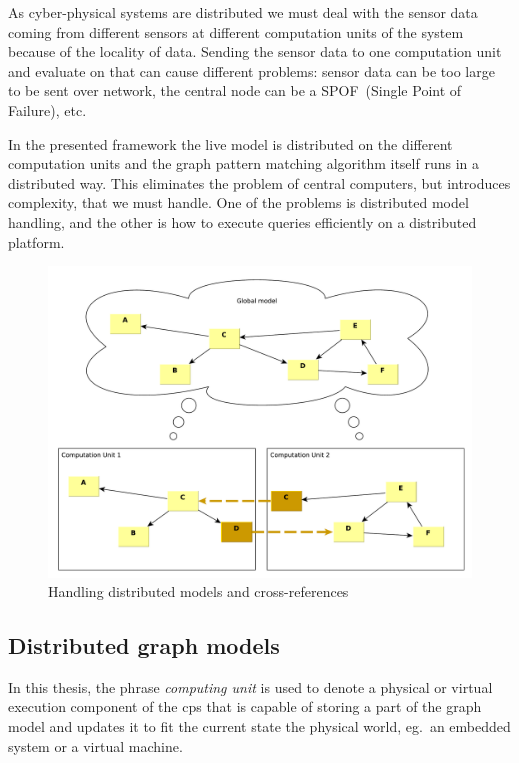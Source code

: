 As cyber-physical systems are distributed we must deal with the sensor data coming from different sensors at different computation units of the system because of the locality of data. 
Sending the sensor data to one computation unit and evaluate on that can cause different problems: 
sensor data can be too large to be sent over network, the central node can be a SPOF~(Single Point of Failure), etc. 

In the presented framework the live model is distributed on the different computation units and the graph pattern matching algorithm itself runs in a distributed way. 
This eliminates the problem of central computers, but introduces complexity, that we must handle.
One of the problems is distributed model handling, and the other is how to execute queries efficiently on a distributed platform.



\begin{figure}[h]
	\begin{center}
		\includegraphics[width=\textwidth]{figures/distributed-model-handling.pdf}
		\caption{Handling distributed models and cross-references}
		\label{fig:distributed-model-handling}
	\end{center}
\end{figure}



\subsection{Distributed graph models}

In this thesis, the phrase \emph{computing unit} is used to denote a physical or virtual execution component of the cps that is capable of storing a part of the graph model and updates it to fit the current state the physical world, eg.\ an embedded system or a virtual machine.

